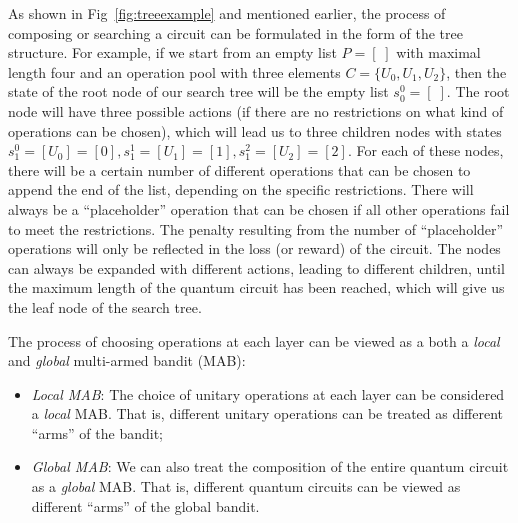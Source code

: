 \documentclass[a4paper,onecolumn,11pt]{quantumarticle}
\begin{document}
As shown in Fig~\ref{fig:treeexample} and mentioned earlier, the process of composing or searching a circuit can be formulated in the form of the tree structure. For example, if we start from an empty list $P = [\;]$ with maximal length four and an operation pool with three elements $C = \{U_0, U_1, U_2\}$, 
then the state of the root node of our search tree will be the empty list $s_0^0 = [\;]$. The root node will have three possible actions (if there are no restrictions on what kind of operations can be chosen), which will lead us to three children nodes with states $s_1^0 = [U_0]=[0], s_1^1 = [U_1]=[1], s_1^2=[U_2] = [2]$. For each of these nodes, there will be a certain number of different operations that can be chosen to append the end of the list, depending on the specific restrictions. There will always be a ``placeholder'' operation that can be chosen if all other operations fail to meet the restrictions. The penalty resulting from the number of ``placeholder'' operations will only be reflected in the loss (or reward) of the circuit. The nodes can always be expanded with different actions, leading to different children, until the maximum length of the quantum circuit has been reached, which will give us the leaf node of the search tree. 

The process of choosing operations at each layer can be viewed as a both a \textit{local} and \textit{global} multi-armed bandit (MAB):
\begin{itemize}
    \item \textit{Local MAB}: The choice of unitary operations at each layer can be considered a \textit{local} MAB. That is, different unitary operations can be treated as different ``arms'' of the bandit;
    \item \textit{Global MAB}: We can also treat the composition of the entire quantum circuit as a \textit{global} MAB. That is, different quantum circuits can be viewed as different ``arms'' of the global bandit.
\end{itemize}


\end{document}
